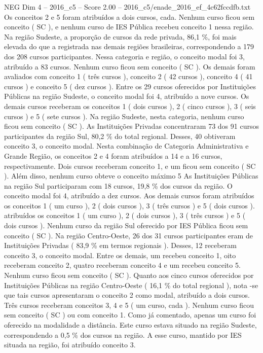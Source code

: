 \begin{textsample}{NEG Dim 4 – 2016\_c5 – Score 2.00 – 2016\_c5/enade\_2016\_ef\_4c62fccdfb.txt}
Os conceitos 2 e 5 foram atribuídos a dois cursos, cada.
Nenhum curso ficou sem conceito ( SC ), e nenhum curso de IES Pública recebeu conceito 1 nessa região.
Na região Sudeste, a proporção de cursos da rede privada, 86,1 \%, foi mais elevada do que a registrada nas demais regiões brasileiras, correspondendo a 179 dos 208 cursos participantes.
Nessa categoria e região, o conceito modal foi 3, atribuído a 83 cursos.
Nenhum curso ficou sem conceito ( SC ).
Os demais foram avaliados com conceito 1 ( três cursos ), conceito 2 ( 42 cursos ), conceito 4 ( 41 cursos ) e conceito 5 ( dez cursos ).
Entre os 29 cursos oferecidos por Instituições Públicas na região Sudeste, o conceito modal foi 4, atribuído a nove cursos.
Os demais cursos receberam os conceitos 1 ( dois cursos ), 2 ( cinco cursos ), 3 ( seis cursos ) e 5 ( sete cursos ).
Na região Sudeste, nesta categoria, nenhum curso ficou sem conceito ( SC ).
As Instituições Privadas concentraram 73 dos 91 cursos participantes da região Sul, 80,2 \% do total regional.
Desses, 40 obtiveram conceito 3, o conceito modal.
Nesta combinação de Categoria Administrativa e Grande Região, os conceitos 2 e 4 foram atribuídos a 14 e a 16 cursos, respectivamente.
Dois cursos receberam conceito 1, e um ficou sem conceito ( SC ).
Além disso, nenhum curso obteve o conceito máximo 5 As Instituições Públicas na região Sul participaram com 18 cursos, 19,8 \% dos cursos da região.
O conceito modal foi 4, atribuído a dez cursos.
Aos demais cursos foram atribuídos os conceitos 1 ( um curso ), 2 ( dois cursos ), 3 ( três cursos ) e 5 ( dois cursos ). atribuídos os conceitos 1 ( um curso ), 2 ( dois cursos ), 3 ( três cursos ) e 5 ( dois cursos ).
Nenhum curso da região Sul oferecido por IES Pública ficou sem conceito ( SC ).
Na região Centro-Oeste, 26 dos 31 cursos participantes eram de Instituições Privadas ( 83,9 \% em termos regionais ).
Desses, 12 receberam conceito 3, o conceito modal.
Entre os demais, um recebeu conceito 1, oito receberam conceito 2, quatro receberam conceito 4 e um recebeu conceito 5.
Nenhum curso ficou sem conceito ( SC ).
Quanto aos cinco cursos oferecidos por Instituições Públicas na região Centro-Oeste ( 16,1 \% do total regional ), nota -se que tais cursos apresentaram o conceito 2 como modal, atribuído a dois cursos.
Três cursos receberam conceitos 3, 4 e 5 ( um curso, cada ).
Nenhum curso ficou sem conceito ( SC ) ou com conceito 1.
Como já comentado, apenas um curso foi oferecido na modalidade a distância.
Este curso estava situado na região Sudeste, correspondendo a 0,5 \% dos cursos na região.
A esse curso, mantido por IES situada na região, foi atribuído conceito 3.

\end{textsample}
